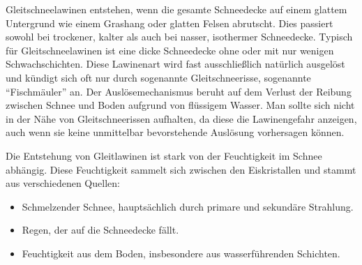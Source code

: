 


Gleitschneelawinen entstehen, wenn die gesamte Schneedecke auf einem glattem Untergrund wie einem Grashang oder glatten Felsen abrutscht. Dies passiert sowohl bei trockener, kalter als auch bei nasser, isothermer Schneedecke. Typisch für Gleitschneelawinen ist eine dicke Schneedecke ohne oder mit nur wenigen Schwachschichten. Diese Lawinenart wird fast ausschließlich natürlich ausgelöst und kündigt sich oft nur durch sogenannte Gleitschneerisse, sogenannte “Fischmäuler” an. Der Auslösemechanismus beruht auf dem Verlust der Reibung zwischen Schnee und Boden aufgrund von flüssigem Wasser. Man sollte sich nicht in der Nähe von Gleitschneerissen aufhalten, da diese die Lawinengefahr anzeigen, auch wenn sie  keine unmittelbar bevorstehende Auslösung vorhersagen können.

Die Entstehung von Gleitlawinen ist stark von der Feuchtigkeit im Schnee abhängig. Diese Feuchtigkeit sammelt sich zwischen den Eiskristallen und stammt aus verschiedenen Quellen:

\begin{itemize}
    \item Schmelzender Schnee, hauptsächlich durch primare und sekundäre Strahlung.
    \item Regen, der auf die Schneedecke fällt.
    \item Feuchtigkeit aus dem Boden, insbesondere aus wasserführenden Schichten.
\end{itemize}
